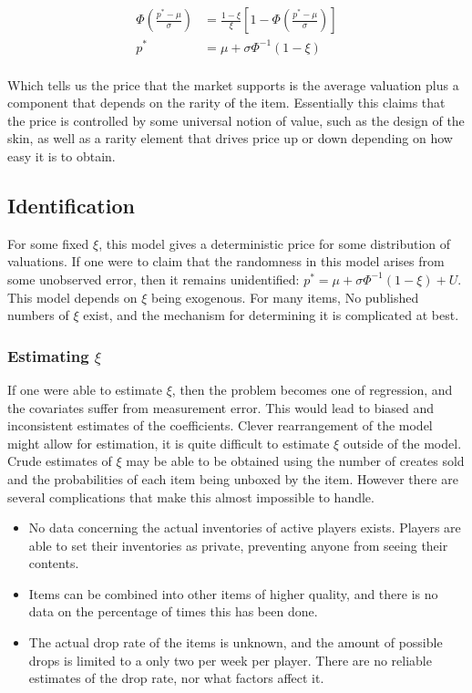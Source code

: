 \documentclass[12pt, letterpaper]{paper}
\begin{document}
\begin{align*}
\Phi \left ( \frac{ p^* - \mu }{\sigma} \right ) &= \frac{1-\xi}{\xi} \left [ 1 - \Phi \left
( \frac{ p^* - \mu }{\sigma} \right ) \right ]\\
p^* &= \mu + \sigma \Phi^{-1} ( 1- \xi )\\
\end{align*}

Which tells us the price that the market supports is the average
valuation plus a component that depends on the rarity of the
item. Essentially this claims that the price is controlled by some
universal notion of value, such as the design of the skin, as well as
a rarity element that drives price up or down depending on how easy it
is to obtain.

\subsection{Identification}
\label{sec-2-2}
For some fixed $\xi$, this model gives a deterministic price for some
distribution of valuations. If one were to claim that the randomness
in this model arises from some unobserved error, then it remains
unidentified: $p^* = \mu + \sigma \Phi^{-1} \left ( 1 - \xi \right ) + U$. This model
depends on $\xi$ being exogenous. For many items, No published numbers of $\xi$
exist, and the mechanism for determining it is complicated at best.

\subsubsection{Estimating $\xi$}
\label{sec-2-2-1}

If one were able to estimate $\xi$, then the problem becomes one of
regression, and the covariates suffer from measurement error. This
would lead to biased and inconsistent estimates of the
coefficients. Clever rearrangement of the model might allow for
estimation, it is quite difficult to estimate $\xi$ outside of the
model. Crude estimates of $\xi$ may be able to be obtained using the
number of creates sold and the probabilities of each item being
unboxed by the item. However there are several complications that make
this almost impossible to handle.

\begin{itemize}
\item No data concerning the actual inventories of active
players exists. Players are able to set their inventories as private,
preventing anyone from seeing their contents.
\item Items can be combined into other items of higher quality, and there
is no data on the percentage of times this has been done.
\item The actual drop rate of the items is unknown, and the amount of
possible drops is limited to a only two per week per player. There
are no reliable estimates of the drop rate, nor what factors affect
it.
\end{itemize}
\end{document}
